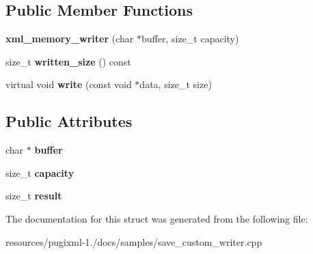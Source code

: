 \subsection*{Public Member Functions}
\begin{DoxyCompactItemize}
\item 
\hypertarget{structxml__memory__writer_adbcc4bace05d4a174c24cb4731b32881}{{\bfseries xml\+\_\+memory\+\_\+writer} (char $\ast$buffer, size\+\_\+t capacity)}\label{structxml__memory__writer_adbcc4bace05d4a174c24cb4731b32881}

\item 
\hypertarget{structxml__memory__writer_a8f3b4725568f62ad17f7f138d9a76257}{size\+\_\+t {\bfseries written\+\_\+size} () const }\label{structxml__memory__writer_a8f3b4725568f62ad17f7f138d9a76257}

\item 
\hypertarget{structxml__memory__writer_a5b32fe490374a4539cd6b3d40a7876ef}{virtual void {\bfseries write} (const void $\ast$data, size\+\_\+t size)}\label{structxml__memory__writer_a5b32fe490374a4539cd6b3d40a7876ef}

\end{DoxyCompactItemize}
\subsection*{Public Attributes}
\begin{DoxyCompactItemize}
\item 
\hypertarget{structxml__memory__writer_a835b78d52bb768c3a67da998c2c17d72}{char $\ast$ {\bfseries buffer}}\label{structxml__memory__writer_a835b78d52bb768c3a67da998c2c17d72}

\item 
\hypertarget{structxml__memory__writer_aa389b21600101759566147b5ccb84d86}{size\+\_\+t {\bfseries capacity}}\label{structxml__memory__writer_aa389b21600101759566147b5ccb84d86}

\item 
\hypertarget{structxml__memory__writer_ad1ca31a422bbed9b1a0275f6a8647769}{size\+\_\+t {\bfseries result}}\label{structxml__memory__writer_ad1ca31a422bbed9b1a0275f6a8647769}

\end{DoxyCompactItemize}


The documentation for this struct was generated from the following file\+:\begin{DoxyCompactItemize}
\item 
resources/pugixml-\/1./docs/samples/save\+\_\+custom\+\_\+writer.\+cpp\end{DoxyCompactItemize}
